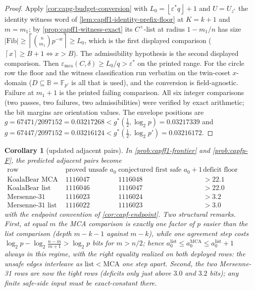 \documentclass[11pt]{article}
\newtheorem{corollary}[corollary]{Corollary}
\theoremstyle{definition}
\theoremstyle{remark}
\newcommand{\F}{\mathbb{F}}
\newcommand{\B}{\mathbb{B}}
\newcommand{\emca}{\varepsilon_{\mathrm{mca}}}
\providecommand{\ceil}[1]{\left\lceil #1\right\rceil}
\providecommand{\floor}[1]{\left\lfloor #1\right\rfloor}
\begin{document}
\begin{proof}
Apply \cref{cor:capg-budget-conversion} with
$L_0=\floor{\varepsilon^{*}q}+1$ and $U=U_{z^{*}}$ the identity witness
word of \cref{lem:capff1-identity-prefix-floor} at $K=k+1$ and $m=m_1$;
by \cref{prop:capff1-witness-exact} its $C^{+}$-list at radius $1-m_1/n$
has size $|\mathrm{Fib}|\ge\ceil{\binom n{m_1}p^{-w}}\ge L_0$, which is
the first displayed comparison ($\ceil{x}\ge B+1\iff x>B$).  The
admissibility hypothesis is the second displayed comparison.  Then
$\emca(C,\delta)\ge L_0/q>\varepsilon^{*}$ on the printed range.  For the
circle row the floor and the witness classification run verbatim on the
twin-coset $x$-domain ($D\subseteq\B=\F_{p'}$ is all that is used), and
the conversion is field-agnostic.  Failure at $m_1+1$ is the printed
failing comparison.  All six integer comparisons (two passes, two
failures, two admissibilities) were verified by exact arithmetic; the bit
margins are orientation values.  The envelope positions are
$g=67471/2097152=0.03217268<g^{*}(\tfrac12,\log_2p)=0.03217339$ and
$g=67447/2097152=0.03216124<g^{*}(\tfrac12,\log_2p')=0.03216172$.
\end{proof}

\begin{corollary}[updated adjacent pairs]\label{cor:capg-adjacent-pairs}
In \cref{prob:capff1-frontier} and \cref{prob:capfp-F}, the predicted
adjacent pairs become
\[
\begin{array}{c|cc|c}
\text{row} & \text{proved unsafe }a_0 & \text{conjectured first safe }a_0+1
& \text{deficit floor (bits)}\\ \hline
\text{KoalaBear MCA} & 1116047 & 1116048 & \ensuremath{>22.1}\\
\text{KoalaBear list} & 1116046 & 1116047 & \ensuremath{>22.0}\\
\text{Mersenne-31 MCA} & 1116023 & 1116024 & \ensuremath{>3.2}\\
\text{Mersenne-31 list} & 1116022 & 1116023 & \ensuremath{>3.0}
\end{array}
\]
with the endpoint convention of \cref{cor:capf-endpoint}.  Two structural
remarks.  First, at equal $m$ the MCA comparison is exactly one factor of
$p$ easier than the list comparison (depth $m-k-1$ against $m-k$), while
one agreement step costs $\log_2p-\log_2\frac{n-m}{m+1}>\log_2p$ bits
for $m>n/2$; hence
$a_0^{\mathrm{list}}\le a_0^{\mathrm{MCA}}\le a_0^{\mathrm{list}}+1$
always in this regime, with the right equality realized on both deployed
rows: the unsafe edges interleave as
$\mathrm{list}<\mathrm{MCA}$ one step apart.  Second,
the two Mersenne-31 rows are now the tight rows (deficits only just above $3.0$ and $3.2$ bits);
any finite safe-side input must be exact-constant there.
\end{corollary}
\end{document}

